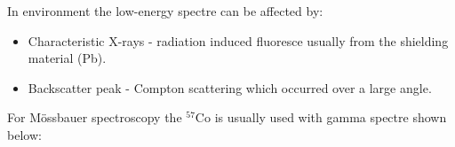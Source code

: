 In environment the low-energy spectre can be affected by:
\begin{itemize}
\item Characteristic X-rays - radiation induced fluoresce usually from the shielding material (Pb).
\item Backscatter peak - Compton scattering which occurred over a large angle.
\end{itemize}


For Mössbauer spectroscopy the $^{57}$Co is usually used with gamma spectre shown below:


